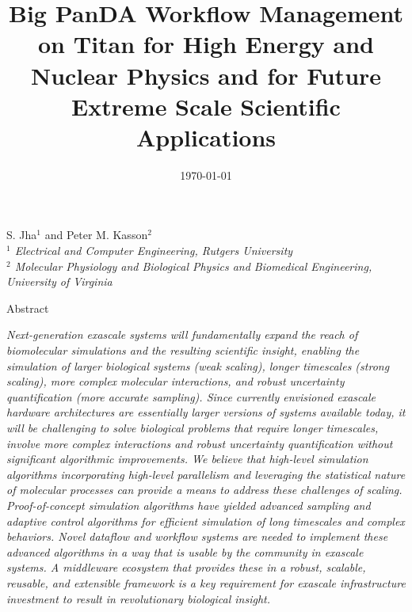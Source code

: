 \documentclass[10pt,letterpaper,draft]{article}
\date{\today}
\title{\bf Big PanDA Workflow Management on Titan for High Energy and Nuclear Physics and for Future Extreme Scale Scientific Applications}
\begin{document}




\renewcommand{\thepage}{\arabic{page}}


\thispagestyle{empty}
\begin{center} 

\vspace{0.25in}
\large S. Jha$^1$ and Peter M. Kasson$^2$\\

\small {\it $^1$ Electrical and Computer Engineering, Rutgers University} \\
\small {\it $^2$ Molecular Physiology and Biological Physics and Biomedical
  Engineering, University of Virginia}

\vspace{0.25in}

\large Abstract

\end{center} {\it Next-generation exascale systems will fundamentally expand the reach of biomolecular simulations and the resulting scientific insight, enabling the simulation of larger biological systems (weak scaling), longer timescales (strong scaling), more complex molecular interactions, and robust uncertainty quantification (more accurate sampling).  Since currently envisioned exascale hardware architectures are essentially larger versions of systems available today, it will be challenging to solve biological problems that require longer timescales, involve more complex interactions and robust uncertainty quantification without significant algorithmic improvements.  We believe that high-level simulation algorithms incorporating high-level parallelism and leveraging the statistical nature of molecular processes can provide a means to address these challenges of scaling.  Proof-of-concept simulation algorithms have yielded advanced sampling and adaptive control algorithms for efficient simulation of long timescales and complex behaviors. Novel dataflow and workflow systems are needed to implement these advanced algorithms in a way that is usable by the community in exascale systems. A middleware ecosystem that provides these in a robust, scalable, reusable, and extensible framework is a key requirement for exascale infrastructure investment to result in revolutionary biological insight.  }
\end{document}
